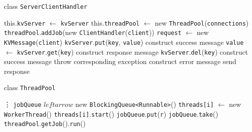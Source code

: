 \documentclass{article}
\begin{document}
\begin{algorithm}
    \caption{class \texttt{ServerClientHandler}}
	\begin{algorithmic}
            \State this.\texttt{kvServer} $\leftarrow$ \texttt{kvServer}
            \State this.\texttt{threadPool} $\leftarrow$ new \texttt{ThreadPool}(\texttt{connections})
        \EndProcedure
            \State \texttt{threadPool}.\texttt{addJob}(new \texttt{ClientHandler}(\texttt{client}))
        \EndProcedure
            \State \texttt{request} $\leftarrow$ new \texttt{KVMessage}(\texttt{client})
                \State \texttt{kvServer}.\texttt{put}(\texttt{key}, \texttt{value})
                \State construct success message
                \State \texttt{value} $\leftarrow$ \texttt{kvServer}.\texttt{get}(\texttt{key})
                \State construct response message
                \State \texttt{kvServer}.\texttt{del}(\texttt{key})
                \State construct success message
            \Else
                \State throw corresponding exception
            \EndIf
                \State construct error message
            \EndIf
            \State send response
        \EndProcedure
	\end{algorithmic}
\end{algorithm}

\begin{algorithm}
    \caption{class \texttt{ThreadPool}}
	\begin{algorithmic}
            \State \vdots
            \State \texttt{jobQueue} $leftarrow$ new \texttt{BlockingQueue<Runnable>}()
                \State \texttt{threads[i]} $\leftarrow$ new \texttt{WorkerThread}()
                \State \texttt{threads[i]}.\texttt{start}()
            \EndFor
        \EndProcedure
            \State \texttt{jobQueue}.\texttt{put}(\texttt{r})
        \EndProcedure
            \State \Return \texttt{jobQueue}.\texttt{take}()
        \EndProcedure
                \State \texttt{threadPool}.\texttt{getJob}().\texttt{run}()
            \EndWhile
        \EndProcedure
	\end{algorithmic}
\end{algorithm}
\end{document}

